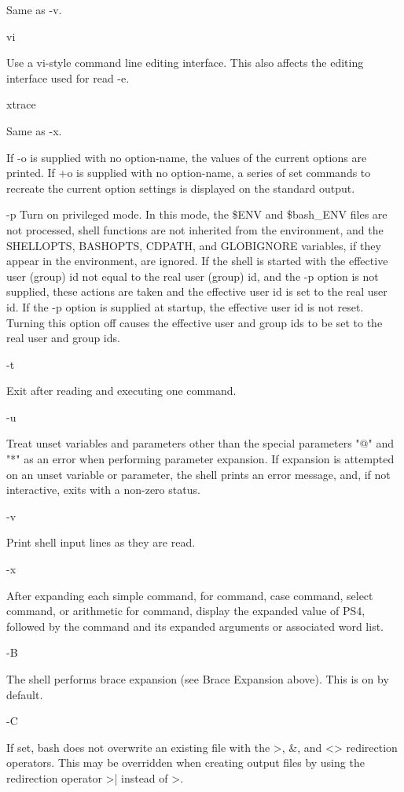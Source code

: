 {{{{{{Same as -v.

vi

Use a vi-style command line editing interface. This also affects the editing interface used for read -e.

xtrace

Same as -x.

If -o is supplied with no option-name, the values of the current options are printed. If +o is supplied with no option-name, a series of set commands to recreate the current option settings is displayed on the standard output.

-p
Turn on privileged mode. In this mode, the \$ENV and \$bash\_ENV files are not processed, shell functions are not inherited from the environment, and the SHELLOPTS, BASHOPTS, CDPATH, and GLOBIGNORE variables, if they appear in the environment, are ignored. If the shell is started with the effective user (group) id not equal to the real user (group) id, and the -p option is not supplied, these actions are taken and the effective user id is set to the real user id. If the -p option is supplied at startup, the effective user id is not reset. Turning this option off causes the effective user and group ids to be set to the real user and group ids.

-t

Exit after reading and executing one command.

-u

Treat unset variables and parameters other than the special parameters "@" and "*" as an error when performing parameter expansion. If expansion is attempted on an unset variable or parameter, the shell prints an error message, and, if not interactive, exits with a non-zero status.

-v

Print shell input lines as they are read.

-x

After expanding each simple command, for command, case command, select command, or arithmetic for command, display the expanded value of PS4, followed by the command and its expanded arguments or associated word list.

-B

The shell performs brace expansion (see Brace Expansion above). This is on by default.

-C

If set, bash does not overwrite an existing file with the >, \&, and <> redirection operators. This may be overridden when creating output files by using the redirection operator >| instead of >.

}}}}}}
